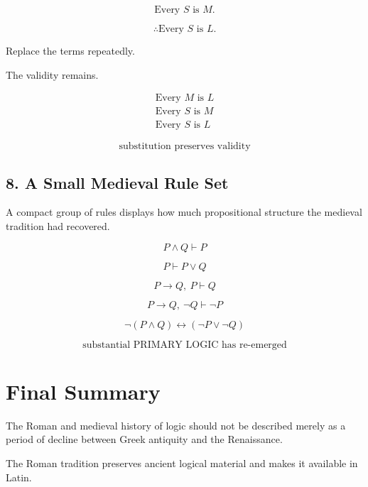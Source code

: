 \documentclass[11pt]{article}
\begin{document}
\[
\text{Every }S\text{ is }M.
\]

\[
\therefore \text{Every }S\text{ is }L.
\]

Replace the terms repeatedly.

The validity remains.

\begin{whiteboard}
\[
\begin{array}{c}
\text{Every }M\text{ is }L\\
\text{Every }S\text{ is }M\\
\hline
\text{Every }S\text{ is }L
\end{array}
\]

\[
\boxed{\text{substitution preserves validity}}
\]
\end{whiteboard}


\subsection*{8. A Small Medieval Rule Set}

A compact group of rules displays how much propositional
structure the medieval tradition had recovered.

\begin{whiteboard}
\[
P\land Q \vdash P
\]

\[
P \vdash P\lor Q
\]

\[
P\rightarrow Q,\ P \vdash Q
\]

\[
P\rightarrow Q,\ \neg Q \vdash \neg P
\]

\[
\neg(P\land Q)
\leftrightarrow
(\neg P\lor\neg Q)
\]

\[
\boxed{\text{substantial PRIMARY LOGIC has re-emerged}}
\]
\end{whiteboard}


\section{Final Summary}

The Roman and medieval history of logic should not be described
merely as a period of decline between Greek antiquity and the
Renaissance.

The Roman tradition preserves ancient logical material and makes
it available in Latin.
\end{document}
